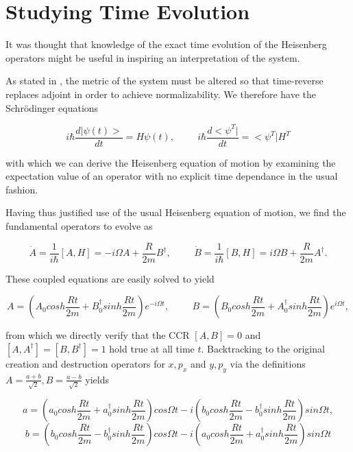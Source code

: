\section{Studying Time Evolution}

It was thought that knowledge of the exact time evolution of the Heisenberg
operators might be useful in inspiring an interpretation of the system.

As stated in \cite{ft:fest}, the metric of the system must be altered so that
time-reverse replaces adjoint in order to achieve normalizability.  We
therefore have the Schr\"odinger equations

\begin{equation}
i \hbar \frac{d |\psi(t)>}{d t} = H \psi(t), \hspace{1cm} i \hbar \frac{d <\psi^{T}|}{d t} =
	<\psi^{T}| H^{T}
\end{equation}

with which we can derive the Heisenberg equation of motion by examining the
expectation value of an operator with no explicit time dependance in
the usual fashion.

Having thus justified use of the usual Heisenberg equation of motion, we find
the fundamental operators to evolve as

\begin{equation}
\dot{A} = \frac{1}{i \hbar} [A, H] = - i \Omega A + \frac{R}{2 m} B^{\dagger},
\hspace{1cm}
\dot{B} = \frac{1}{i \hbar} [B, H] = i \Omega B + \frac{R}{2 m} A^{\dagger}.
\end{equation}

These coupled equations are easily solved to yield

\begin{equation}
A = (A_{0} cosh\frac{R t}{2 m} + B_{0}^{\dagger} sinh\frac{R t}{2 m}) e^{- i
        \Omega t},
\hspace{1cm}
B = (B_{0} cosh\frac{R t}{2 m} + A_{0}^{\dagger} sinh\frac{R t}{2 m}) e^{i
        \Omega t},
\end{equation}

from which we directly verify that the CCR  $[A, B] = 0$ and
$[A, A^{\dagger}] = [B, B^{\dagger}] = 1$ hold true at all time $t$.
Backtracking to the original creation and destruction operators for
$x, p_{x}$ and $y, p_{y}$ via the definitions $A = \frac{a + b}{\sqrt{2}},
B = \frac{a - b}{\sqrt{2}}$ yields

\begin{equation}
a = (a_{0} cosh\frac{R t}{2 m} + a_{0}^{\dagger} sinh\frac{R t}{2 m}) 
	cos \Omega t - i (b_{0} cosh\frac{R t}{2 m} - b_{0}^{\dagger}
	sinh \frac{R t}{2 m}) sin \Omega t,
\end{equation}
\begin{equation}
b = (b_{0} cosh\frac{R t}{2 m} - b_{0}^{\dagger} sinh\frac{R t}{2 m})
	cos \Omega t - i (a_{0} cosh\frac{R t}{2 m} + a_{0}^{\dagger}
	sinh\frac{R t}{2 m}) sin \Omega t
\end{equation}

